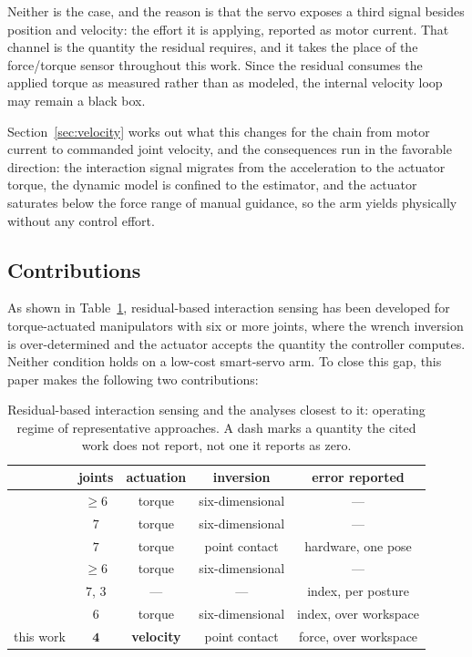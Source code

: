 \documentclass{ieeeaccess}
\begin{document}
Neither is the case, and the reason is that the servo exposes a third signal
besides position and velocity: the effort it is applying, reported as motor
current. That channel is the quantity the residual requires, and it takes the place
of the force/torque sensor throughout this work. Since the residual consumes the
applied torque as measured rather than as modeled, the internal velocity loop may
remain a black box.

Section~\ref{sec:velocity} works out what this changes for the chain from motor
current to commanded joint velocity, and the consequences run in the favorable
direction: the interaction signal migrates from the acceleration to the actuator
torque, the dynamic model is confined to the estimator, and the actuator saturates
below the force range of manual guidance, so the arm yields physically without any
control effort.

\subsection{Contributions}
\label{sec:claims}
As shown in Table~\ref{tab:gap}, residual-based interaction sensing has been
developed for torque-actuated manipulators with six or more joints, where the
wrench inversion is over-determined and the actuator accepts the quantity the
controller computes. Neither condition holds on a low-cost smart-servo arm. To
close this gap, this paper makes the following two contributions:

\begin{table}[!t]
\caption{Residual-based interaction sensing and the analyses closest to it:
operating regime of representative approaches. A dash marks a quantity the cited
work does not report, not one it reports as zero.}
\label{tab:gap}
\centering
\footnotesize
\setlength{\tabcolsep}{3pt}
\begin{tabular}{lcccc}
\toprule
 & joints & actuation & inversion & error reported\\
\midrule
\cite{deluca2005sensorless}  & $\ge6$ & torque & six-dimensional & --- \\
\cite{deluca2006collision}   & $7$    & torque & six-dimensional & --- \\
\cite{magrini2014virtual}    & $7$    & torque & point contact   & hardware, one pose \\
\cite{haddadin2017survey}    & $\ge6$ & torque & six-dimensional & --- \\
\cite{wong2024sensorobs}     & $7$, $3$ & ---  & ---             & index, per posture \\
\cite{lu2023configopt}       & $6$    & torque & six-dimensional & index, over workspace \\
\midrule
this work & $\bm{4}$ & \textbf{velocity} & point contact & force, over workspace\\
\bottomrule
\end{tabular}
\end{table}
\end{document}
